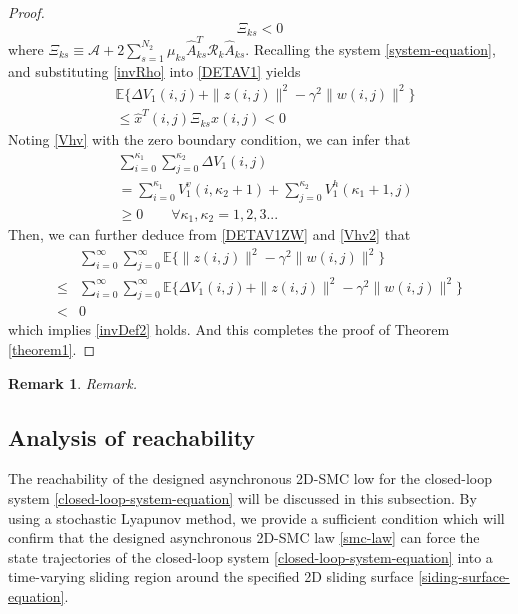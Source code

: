 \documentclass[conference]{IEEEtran}
\newtheorem{remark}{Remark}
\begin{document}
\begin{proof}
	\begin{equation}\label{T1P4}
	\mathcal{\varXi}_{ks}<0
	\end{equation}	
	where $\mathcal{\varXi}_{ks} \equiv \mathcal{A} +2\sum_{s=1}^{N_{2}}\mu_{ks}\hat{A}^{T}_{ks}\mathcal{R}_{k}\hat{A}_{ks}$. 
	Recalling the system \eqref{system-equation}, and substituting \eqref{invRho} into \eqref{DETAV1} yields
	\begin{equation}\label{DETAV1ZW}
		\begin{split}
			&\mathbb{E}\{\varDelta V_{1}(i,j)+\|z(i,j)\|^{2}-\gamma^{2}\|w(i,j)\|^{2}  \}\\
			&\leq \hat{x}^{T}(i,j)\mathcal{\varXi}_{ks} \hat{x}(i,j)<0
		\end{split}
	\end{equation}
	Noting \eqref{Vhv} with the zero boundary condition, we can infer that
	\begin{equation} \label{Vhv2}
	\begin{split}
	&\sum_{i=0}^{\kappa_{1}}\sum_{j=0}^{\kappa_{2}}  \varDelta V_{1}(i,j)\\
	&=\sum_{i=0}^{\kappa_{1}}V^{v}_{1}(i,\kappa_{2}+1) + \sum_{j=0}^{\kappa_{2}}V^{h}_{1}(\kappa_{1}+1,j) \\
	&\geq 0 \qquad \forall \kappa_{1},\kappa_{2} = 1,2,3...
	\end{split}
	\end{equation}
	Then, we can further deduce from \eqref{DETAV1ZW} and \eqref{Vhv2} that 
	\begin{equation}\label{DETAV1ZW2}
	\begin{split}
	&\sum_{i=0}^{\infty}\sum_{j=0}^{\infty}  \mathbb{E}\{\|z(i,j)\|^{2}-\gamma^{2}\|w(i,j)\|^{2}  \}\\
	\leq& \sum_{i=0}^{\infty}\sum_{j=0}^{\infty}  \mathbb{E}\{\varDelta V_{1}(i,j)+\|z(i,j)\|^{2}-\gamma^{2}\|w(i,j)\|^{2}  \}  \\
	<& 0
	\end{split}
	\end{equation}
	which implies \eqref{invDef2} holds. And this completes the proof of Theorem \ref{theorem1}.
	
	
\end{proof}


\begin{remark}
	Remark.
\end{remark}


\subsection{Analysis of reachability}\label{minimization} 
	 The reachability of the  designed asynchronous 2D-SMC low for the closed-loop system \eqref{closed-loop-system-equation} will be discussed in this subsection. By using a stochastic Lyapunov method, we provide a sufficient condition which will confirm that the designed asynchronous 2D-SMC law \eqref{smc-law} can force the state trajectories of the closed-loop system \eqref{closed-loop-system-equation} into a time-varying sliding region around the specified 2D sliding surface \eqref{siding-surface-equation}.
	 
\end{document}
